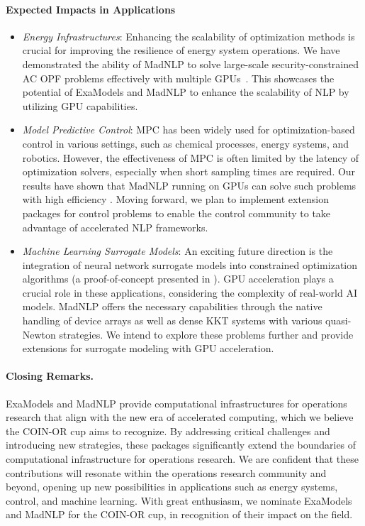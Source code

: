 \paragraph{Expected Impacts in Applications}

\begin{itemize}
\item \textit{Energy Infrastructures}: Enhancing the scalability of
optimization methods is crucial for improving the resilience of energy
system operations. We have demonstrated the ability of MadNLP
to solve large-scale security-constrained AC OPF
problems effectively with multiple GPUs~\cite{pacaud2023parallel}. This showcases the
potential of ExaModels and MadNLP to enhance the scalability of NLP by
utilizing GPU capabilities.

\item \textit{Model Predictive Control}: MPC has been widely used for
optimization-based control in various settings, such as chemical
processes, energy systems, and robotics. However, the effectiveness of
MPC is often limited by the latency of optimization solvers,
especially when short sampling times are required. Our results have
shown that MadNLP running on GPUs can solve such problems with high
efficiency \cite{cole2023exploiting}. Moving forward, we plan to
implement extension packages for control problems to enable
the control community to take advantage of accelerated NLP frameworks.

\item \textit{Machine Learning Surrogate Models}: An exciting future
direction is the integration of neural network surrogate models into
constrained optimization algorithms (a proof-of-concept presented in
\cite{shin2023constrained}). GPU acceleration plays a crucial role in
these applications, considering the complexity of real-world AI
models. MadNLP offers the necessary capabilities through the native
handling of device arrays as well as dense KKT systems with various
quasi-Newton strategies. We intend to explore these problems further
and provide extensions for surrogate modeling with GPU acceleration.

\end{itemize}

\paragraph{Closing Remarks.} ExaModels and MadNLP provide computational
infrastructures for operations research that align with the new era of
accelerated computing, which we believe the COIN-OR cup aims to
recognize. By addressing critical challenges and introducing new
strategies, these packages significantly extend the boundaries of
computational infrastructure for operations research. We are confident
that these contributions will resonate within the operations research
community and beyond, opening up new possibilities in applications
such as energy systems, control, and machine learning. With great
enthusiasm, we nominate ExaModels and MadNLP for the COIN-OR cup, in
recognition of their impact on the field.




